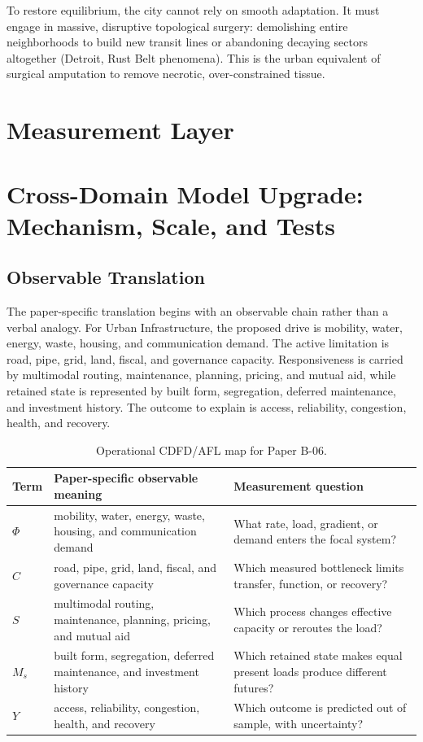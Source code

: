 \documentclass[11pt,a4paper]{article}
\begin{document}
To restore equilibrium, the city cannot rely on smooth adaptation. It must engage in massive, disruptive topological surgery: demolishing entire neighborhoods to build new transit lines or abandoning decaying sectors altogether (Detroit, Rust Belt phenomena). This is the urban equivalent of surgical amputation to remove necrotic, over-constrained tissue.



\section{Measurement Layer}

\section{Cross-Domain Model Upgrade: Mechanism, Scale, and Tests}

\subsection{Observable Translation}

The paper-specific translation begins with an observable chain rather than a
verbal analogy. For Urban Infrastructure, the proposed drive is mobility, water, energy, waste, housing, and communication demand.
The active limitation is road, pipe, grid, land, fiscal, and governance capacity. Responsiveness is carried by
multimodal routing, maintenance, planning, pricing, and mutual aid, while retained state is represented by
built form, segregation, deferred maintenance, and investment history. The outcome to explain is access, reliability, congestion, health, and recovery.

\begin{table}[htbp]
\centering
\small
\caption{Operational CDFD/AFL map for Paper B-06.}
\begin{tabularx}{\textwidth}{|l|X|X|}
\hline
\textbf{Term} & \textbf{Paper-specific observable meaning} & \textbf{Measurement question} \\
\hline
$\Phi$ & mobility, water, energy, waste, housing, and communication demand & What rate, load, gradient, or demand enters the focal system? \\
\hline
$C$ & road, pipe, grid, land, fiscal, and governance capacity & Which measured bottleneck limits transfer, function, or recovery? \\
\hline
$S$ & multimodal routing, maintenance, planning, pricing, and mutual aid & Which process changes effective capacity or reroutes the load? \\
\hline
$M_s$ & built form, segregation, deferred maintenance, and investment history & Which retained state makes equal present loads produce different futures? \\
\hline
$Y$ & access, reliability, congestion, health, and recovery & Which outcome is predicted out of sample, with uncertainty? \\
\hline
\end{tabularx}
\end{table}
\end{document}
